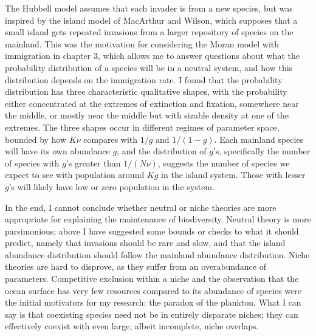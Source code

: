 The Hubbell model assumes that each invader is from a new species, but was inspired by the island model of MacArthur and Wilson, which supposes that a small island gets repeated invasions from a larger repository of species on the mainland. 
This was the motivation for considering the Moran model with immigration in chapter 3, which allows me to answer questions about what the probability distribution of a species will be in a neutral system, and how this distribution depends on the immigration rate. %
I found that the probability distribution has three characteristic qualitative shapes, with the probability either concentrated at the extremes of extinction and fixation, somewhere near the middle, or mostly near the middle but with sizable density at one of the extremes. 
The three shapes occur in different regimes of parameter space, bounded by how $K\nu$ compares with $1/g$ and $1/(1-g)$. 
Each mainland species will have its own abundance $g$, and the distribution of $g$'s, specifically the number of species with $g$'s greater than $1/(N\nu)$, suggests the number of species we expect to see with population around $K g$ in the island system. 
Those with lesser $g$'s will likely have low or zero population in the system. 



In the end, I cannot conclude whether neutral or niche theories are more appropriate for explaining the maintenance of biodiversity. 
Neutral theory is more parsimonious; above I have suggested some bounds or checks to what it should predict, namely that invasions should be rare and slow, and that the island abundance distribution should follow the mainland abundance distribution. %
Niche theories are hard to disprove, as they suffer from an overabundance of parameters. 
Competitive exclusion within a niche and the observation that the ocean surface has very few resources compared to its abundance of species were the initial motivators for my research: the paradox of the plankton. 
What I can say is that coexisting species need not be in entirely disparate niches; they can effectively coexist with even large, albeit incomplete, niche overlaps. 

